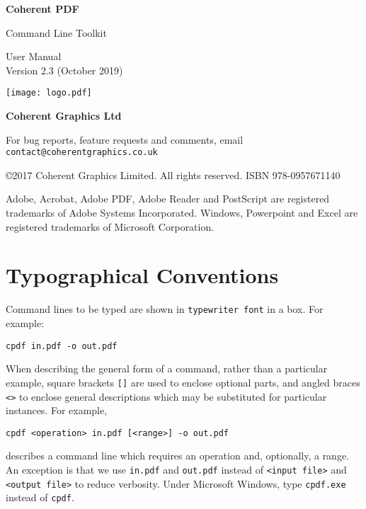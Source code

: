 \documentclass{book}
\newcommand{\smallgap}{\bigskip}
\begin{document}
\frontmatter
\pagestyle{empty}

\begin{flushright}

{\sffamily \bfseries \Huge Coherent PDF

\vspace{2mm}
Command Line Toolkit}

\vspace{12mm}

{\Huge User Manual}\\
Version 2.3 (October 2019)

\vspace{25mm}

\vfill

\texttt{[image: logo.pdf]}

\vspace{2mm}
{\sffamily \bfseries \LARGE Coherent Graphics Ltd}

\end{flushright}

\clearpage

\pagestyle{empty}
\noindent For bug reports, feature requests and comments, email\\ \texttt{contact@coherentgraphics.co.uk}

\vspace*{\fill}
\noindent\copyright 2017 Coherent Graphics Limited. All rights reserved. ISBN 978-0957671140

\smallgap 
\noindent Adobe, Acrobat, Adobe PDF, Adobe Reader and PostScript are
registered trademarks of Adobe Systems Incorporated. Windows, Powerpoint and
Excel are registered trademarks of Microsoft Corporation.

\cleardoublepage
\tableofcontents

\cleardoublepage
\chapter*{Typographical Conventions}
Command lines to be typed are shown in \texttt{typewriter\hspace{-1mm} font} in a box.
For example:
\begin{framed}
\small\verb!cpdf in.pdf -o out.pdf!
\end{framed}
\noindent When describing the general form of a command, rather than a particular
example, square brackets \verb|[]| are used to enclose optional parts, and
angled braces \verb!<>! to enclose general descriptions which may be
substituted for particular instances. For example,
\begin{framed}
\small\verb!cpdf <operation> in.pdf [<range>] -o out.pdf!
\end{framed}
\noindent describes a command line which requires an operation and, optionally,
a range. An exception is that we use \texttt{in.pdf} and \texttt{out.pdf}
instead of \texttt{<input file>} and \texttt{<output file>} to reduce
verbosity. Under Microsoft Windows, type \texttt{cpdf.exe} instead of \texttt{cpdf}.
\cleardoublepage
\mainmatter
\pagestyle{fancy}
\end{document}
